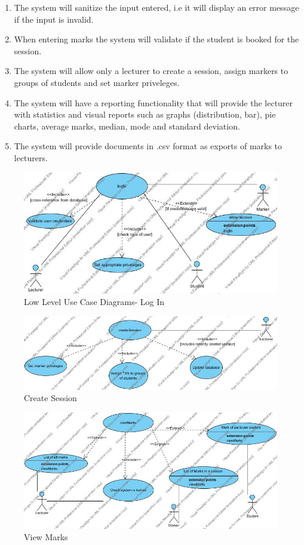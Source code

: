\documentclass[a4paper]{article}
\begin{document}
\begin{enumerate}
		\item The system will sanitize the input entered, i.e it will display an error message if the input is invalid.
		\item When entering marks the system will validate if the student is booked for the session.
		\item The system will allow only a lecturer to create a session, assign markers to groups of students and set marker priveleges.
		\item The system will have a reporting functionality that will provide the lecturer with statistics and visual reports such as graphs (distribution, bar), pie charts, average marks, median, mode and standard deviation. 
		\item The system will provide documents in .csv format as exports of marks to lecturers.
		
		\end{enumerate}
			\begin{figure}[H]
				\centering
				\includegraphics[width=1\textwidth]{logIn}
				\caption{Low Level Use Case Diagrams- Log In}
			\end{figure}
			\begin{figure}[H]
				\centering
				\includegraphics[width=1\textwidth]{createSession}
				\caption{Create Session}
			\end{figure}
			\begin{figure}[H]
				\centering
				\includegraphics[width=1\textwidth]{viewMarks}
				\caption{View Marks}
			\end{figure}
\end{document}

